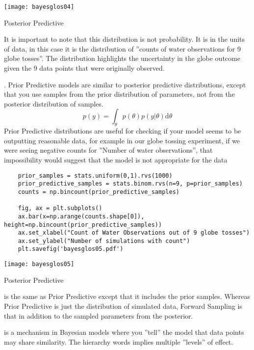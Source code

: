 \begin{marginfigure}
    \texttt{[image: bayesglos04]}
    \caption{Posterior Predictive}
    \end{marginfigure}

It is important to note that this distribution is not probability. It is in the units of data, in this case it is the distribution of ''counts of water observations for 9 globe tosses''. The distribution highlights the uncertainty in the globe outcome given the 9 data points that were originally observed.

. 
Prior Predictive models are similar to posterior predictive distributions, except that you use samples from the prior distribution of parameters, not from the posterior distribution of samples.
\begin{equation}
    p(y)=\int_{\theta} p(\theta) p(y | \theta) \mathrm{d} \theta
    \end{equation}
Prior Predictive distributions are useful for checking if your model seems to be outputting reasonable data, for example in our globe tossing experiment, if we were seeing negative counts for ''Number of water observations'', that impossibility would suggest that the model is not appropriate for the data
\begin{lstlisting}
    prior_samples = stats.uniform(0,1).rvs(1000)
    prior_predictive_samples = stats.binom.rvs(n=9, p=prior_samples)
    counts = np.bincount(prior_predictive_samples)
    
    fig, ax = plt.subplots()
    ax.bar(x=np.arange(counts.shape[0]), height=np.bincount(prior_predictive_samples))
    ax.set_xlabel("Count of Water Observations out of 9 globe tosses")
    ax.set_ylabel("Number of simulations with count")
    plt.savefig('bayesglos05.pdf')
\end{lstlisting}

\begin{marginfigure}
    \texttt{[image: bayesglos05]}
    \caption{Posterior Predictive}
    \end{marginfigure}

 is the same as Prior Predictive except that it includes the prior samples. Whereas Prior Predictive is just the distribution of simulated data, Forward Sampling is that in addition to the sampled parameters from the posterior.

 is a mechanism in Bayesian models where you ''tell'' the model that data points may share similarity. The hierarchy words implies multiple ''levels'' of effect.

